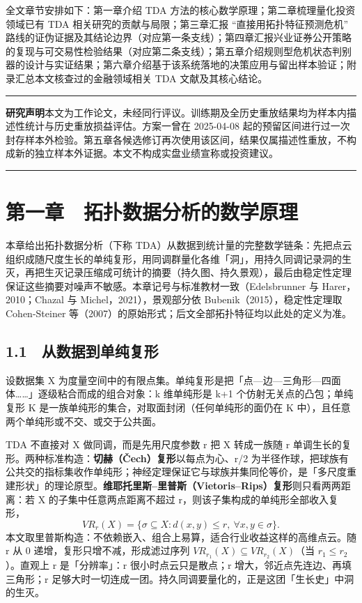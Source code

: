 \documentclass[12pt,a4paper]{ctexart}
\begin{document}
全文章节安排如下：第一章介绍 TDA 方法的核心数学原理；第二章梳理量化投资领域已有 TDA 相关研究的贡献与局限；第三章汇报 “直接用拓扑特征预测危机” 路线的证伪证据及其结论边界（对应第一条支线）；第四章汇报兴业证券公开策略的复现与可交易性检验结果（对应第二条支线）；第五章介绍规则型危机状态判别器的设计与实证结果；第六章介绍基于该系统落地的决策应用与留出样本验证；附录汇总本文核查过的金融领域相关 TDA 文献及其核心结论。

\vspace{0.8em}
\noindent\rule{\textwidth}{0.6pt}
\vspace{0.6em}

\noindent\begin{minipage}{0.96\textwidth}\small\setlength{\parindent}{2em}\sloppy
\textbf{研究声明}\quad 本文为工作论文，未经同行评议。训练期及全历史重放结果均为样本内描述性统计与历史重放损益评估。方案一曾在 2025-04-08 起的预留区间进行过一次封存样本外检验。第五章各候选修订再次使用该区间，结果仅属描述性重放，不构成新的独立样本外证据。本文不构成实盘业绩宣称或投资建议。\par
\end{minipage}

\vspace{0.5em}
\noindent\rule{\textwidth}{0.6pt}

\par
\par
\section{第一章　拓扑数据分析的数学原理}
本章给出拓扑数据分析（下称 TDA）从数据到统计量的完整数学链条：先把点云组织成随尺度生长的单纯复形，用同调群量化各维「洞」，用持久同调记录洞的生灭，再把生灭记录压缩成可统计的摘要（持久图、持久景观），最后由稳定性定理保证这些摘要对噪声不敏感。本章记号与标准教材一致（Edelsbrunner 与 Harer，2010；Chazal 与 Michel，2021），景观部分依 Bubenik（2015），稳定性定理取 Cohen-Steiner 等（2007）的原始形式；后文全部拓扑特征均以此处的定义为准。\par
\subsection{1.1　从数据到单纯复形}
设数据集 X 为度量空间中的有限点集。单纯复形是把「点—边—三角形—四面体……」逐级粘合而成的组合对象：k 维单纯形是 k+1 个仿射无关点的凸包；单纯复形 K 是一族单纯形的集合，对取面封闭（任何单纯形的面仍在 K 中），且任意两个单纯形或不交、或交于公共面。\par
TDA 不直接对 X 做同调，而是先用尺度参数 r 把 X 转成一族随 r 单调生长的复形。两种标准构造：\textbf{切赫（Čech）复形}以每点为心、r/2 为半径作球，把球族有公共交的指标集收作单纯形；神经定理保证它与球族并集同伦等价，是「多尺度重建形状」的理论原型。\textbf{维耶托里斯–里普斯（Vietoris–Rips）复形}则只看两两距离：若 X 的子集中任意两点距离不超过 r，则该子集构成的单纯形全部收入复形，
\[
VR_r(X) = \{\sigma \subseteq X : d(x,y) \le r,\ \forall x,y \in \sigma\}.
\]
本文取里普斯构造：不依赖嵌入、组合上易算，适合行业收益这样的高维点云。随 r 从 0 递增，复形只增不减，形成滤过序列 \(VR_{r_1}(X) \subseteq VR_{r_2}(X)\)（当 \(r_1 \le r_2\)）。直观上 r 是「分辨率」：r 很小时点云只是散点；r 增大，邻近点先连边、再填三角形；r 足够大时一切连成一团。持久同调要量化的，正是这团「生长史」中洞的生灭。\par
\end{document}
